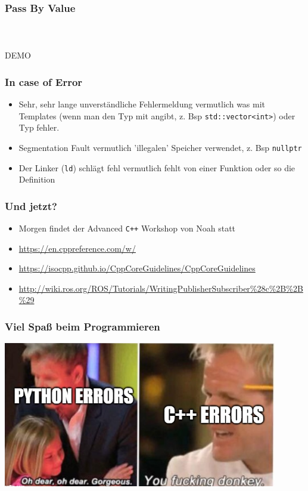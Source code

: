 \documentclass[plain]{beamer}
\newcommand{\cpp}{\texttt{C++}}
\newcommand{\demoslide}{\begin{frame}
  \center \huge DEMO
\end{frame}}
\begin{document}
\begin{frame}[fragile]
  \frametitle{Pass By Value}
  \begin{columns}
    \inputminted[firstline=0, lastline=17]{cpp}{code/examples/passbyvalue.cpp}
    \inputminted[firstline=19]{cpp}{code/examples/passbyvalue.cpp}
  \end{columns}
\end{frame}

\demoslide{}

\begin{frame}
  \frametitle{In case of Error}
  \begin{itemize}
    \item Sehr, sehr lange unverständliche Fehlermeldung \textrightarrow{} vermutlich was mit
      Templates (wenn man den Typ mit angibt, z. Bsp \texttt{std::vector<int>}) oder Typ fehler.
    \item Segmentation Fault \textrightarrow{} vermutlich 'illegalen' Speicher verwendet, z. Bsp
      \texttt{nullptr}
    \item Der Linker (\texttt{ld}) schlägt fehl \textrightarrow{} vermutlich fehlt von einer
      Funktion oder so die Definition
  \end{itemize}
\end{frame}

\begin{frame}
  \frametitle{Und jetzt?}
  \begin{itemize}
    \item Morgen findet der Advanced \cpp{} Workshop von Noah statt
    \item \url{https://en.cppreference.com/w/}
    \item \url{https://isocpp.github.io/CppCoreGuidelines/CppCoreGuidelines}
    \item \url{http://wiki.ros.org/ROS/Tutorials/WritingPublisherSubscriber\%28c\%2B\%2B\%29}
  \end{itemize}
\end{frame}

\begin{frame}
  \frametitle{Viel Spaß beim Programmieren}
  \center \includegraphics[width=0.9\textwidth]{imgs/error-messages.png}
\end{frame}
\end{document}
